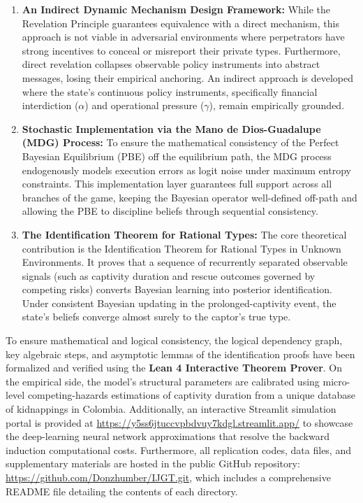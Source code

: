 \documentclass[12pt]{article}
\begin{document}
\begin{enumerate}
    \item \textbf{An Indirect Dynamic Mechanism Design Framework:} While the Revelation Principle guarantees equivalence with a direct mechanism, this approach is not viable in adversarial environments where perpetrators have strong incentives to conceal or misreport their private types. Furthermore, direct revelation collapses observable policy instruments into abstract messages, losing their empirical anchoring. An indirect approach is developed where the state's continuous policy instruments, specifically financial interdiction ($\alpha$) and operational pressure ($\gamma$), remain empirically grounded.
    
    \item \textbf{Stochastic Implementation via the Mano de Dios-Guadalupe (MDG) Process:} To ensure the mathematical consistency of the Perfect Bayesian Equilibrium (PBE) off the equilibrium path, the MDG process endogenously models execution errors as logit noise under maximum entropy constraints. This implementation layer guarantees full support across all branches of the game, keeping the Bayesian operator well-defined off-path and allowing the PBE to discipline beliefs through sequential consistency.
    
    \item \textbf{The Identification Theorem for Rational Types:} The core theoretical contribution is the Identification Theorem for Rational Types in Unknown Environments. It proves that a sequence of recurrently separated observable signals (such as captivity duration and rescue outcomes governed by competing risks) converts Bayesian learning into posterior identification. Under consistent Bayesian updating in the prolonged-captivity event, the state's beliefs converge almost surely to the captor's true type.
\end{enumerate}

To ensure mathematical and logical consistency, the logical dependency graph, key algebraic steps, and asymptotic lemmas of the identification proofs have been formalized and verified using the \textbf{Lean 4 Interactive Theorem Prover}. On the empirical side, the model's structural parameters are calibrated using micro-level competing-hazards estimations of captivity duration from a unique database of kidnappings in Colombia. Additionally, an interactive Streamlit simulation portal is provided at \url{https://y5ss6jtuccvpbdvuy7kdgl.streamlit.app/} to showcase the deep-learning neural network approximations that resolve the backward induction computational costs. Furthermore, all replication codes, data files, and supplementary materials are hosted in the public GitHub repository: \url{https://github.com/Donzhumber/IJGT.git}, which includes a comprehensive README file detailing the contents of each directory.
\end{document}
